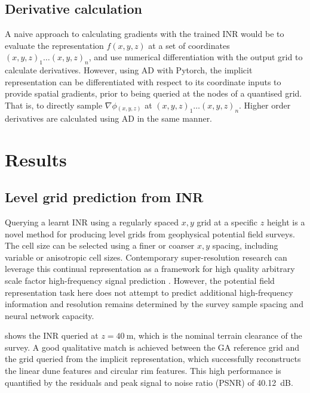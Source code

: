 \documentclass[manuscript.tex]{subfiles}
\begin{document}
\subsection{Derivative calculation}
A naive approach to calculating gradients with the trained INR would be to evaluate the representation \(f(x, y, z)\) at a set of coordinates \({(x, y, z)}_1 \dots {(x,y,z)}_n\), and use numerical differentiation with the output grid to calculate derivatives.
However, using AD with Pytorch, the implicit representation can be differentiated with respect to its coordinate inputs to provide spatial gradients, prior to being queried at the nodes of a quantised grid.
That is, to directly sample \(\nabla{}\phi{}_{(x,y,z)}\) at \({(x, y, z)}_1 \dots {(x,y,z)}_n\).
Higher order derivatives are calculated using AD in the same manner.

\section{Results}
\subsection{Level grid prediction from INR}
Querying a learnt INR using a regularly spaced \(x,y\) grid at a specific \(z\) height is a novel method for producing level grids from geophysical potential field surveys.
The cell size can be selected using a finer or coarser \(x,y\) spacing, including variable or anisotropic cell sizes.
Contemporary super-resolution research can leverage this continual representation as a framework for high quality arbitrary scale factor high-frequency signal prediction \parencite[e.g][]{chenLearningContinuousImage2021}.
However, the potential field representation task here does not attempt to predict additional high-frequency information and resolution remains determined by the survey sample spacing and neural network capacity.

 shows the INR queried at \(z=\SI{40}{\meter}\), which is the nominal terrain clearance of the survey.
A good qualitative match is achieved between the GA reference grid and the grid queried from the implicit representation, which successfully reconstructs the linear dune features and circular rim features.
This high performance is quantified by the residuals and peak signal to noise ratio (PSNR) of \SI{40.12}{\dB}.
\end{document}
